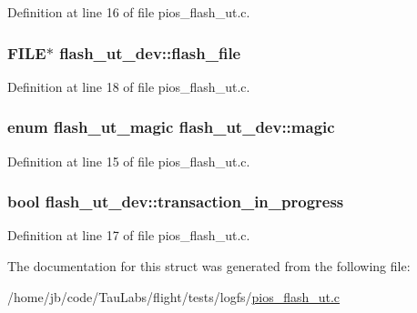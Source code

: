 \-Definition at line 16 of file pios\-\_\-flash\-\_\-ut.\-c.

\hypertarget{structflash__ut__dev_ab7546f7aa05d2a2a0eb9ce54b9d4620a}{
\subsubsection[{flash\-\_\-file}]{\setlength{\rightskip}{0pt plus 5cm}\-F\-I\-L\-E$\ast$ {\bf flash\-\_\-ut\-\_\-dev\-::flash\-\_\-file}}}\label{structflash__ut__dev_ab7546f7aa05d2a2a0eb9ce54b9d4620a}


\-Definition at line 18 of file pios\-\_\-flash\-\_\-ut.\-c.

\hypertarget{structflash__ut__dev_aefafb502345249d19bb9b82d91e1a4a7}{
\subsubsection[{magic}]{\setlength{\rightskip}{0pt plus 5cm}enum {\bf flash\-\_\-ut\-\_\-magic} {\bf flash\-\_\-ut\-\_\-dev\-::magic}}}\label{structflash__ut__dev_aefafb502345249d19bb9b82d91e1a4a7}


\-Definition at line 15 of file pios\-\_\-flash\-\_\-ut.\-c.

\hypertarget{structflash__ut__dev_a326284da380f2645162916c9bd58625b}{
\subsubsection[{transaction\-\_\-in\-\_\-progress}]{\setlength{\rightskip}{0pt plus 5cm}bool {\bf flash\-\_\-ut\-\_\-dev\-::transaction\-\_\-in\-\_\-progress}}}\label{structflash__ut__dev_a326284da380f2645162916c9bd58625b}


\-Definition at line 17 of file pios\-\_\-flash\-\_\-ut.\-c.



\-The documentation for this struct was generated from the following file\-:\begin{DoxyCompactItemize}
\item 
/home/jb/code/\-Tau\-Labs/flight/tests/logfs/\hyperlink{pios__flash__ut_8c}{pios\-\_\-flash\-\_\-ut.\-c}\end{DoxyCompactItemize}
